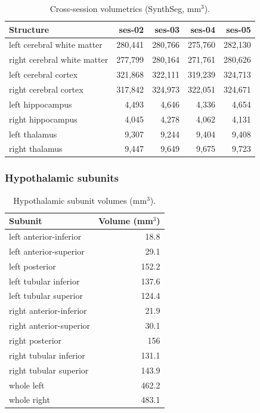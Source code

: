 \documentclass[11pt,a4paper]{article}\usepackage[]{graphicx}\usepackage[]{xcolor}
\begin{document}
\begin{table}[htbp]
\centering
\caption{Cross-session volumetrics (SynthSeg, mm$^3$).}
\label{tab:synthseg}
\begin{tabular}{lrrrr}
\toprule
Structure &  ses-02 & ses-03 & ses-04 & ses-05 \\
\midrule
left cerebral white matter  &  280,441 & 280,766 & 275,760 & 282,130 \\
right cerebral white matter  &  277,799 & 280,164 & 271,761 & 280,626 \\
left cerebral cortex  &  321,868 & 322,111 & 319,239 & 324,713 \\
right cerebral cortex  &  317,842 & 324,973 & 322,051 & 324,671 \\
left hippocampus  &  4,493 & 4,646 & 4,336 & 4,654 \\
right hippocampus  &  4,045 & 4,278 & 4,062 & 4,131 \\
left thalamus  &  9,307 & 9,244 & 9,404 & 9,408 \\
right thalamus  &  9,447 & 9,649 & 9,675 & 9,723 \\
\bottomrule
\end{tabular}
\end{table}


\subsubsection{Hypothalamic subunits}

\begin{table}[htbp]
\centering
\caption{Hypothalamic subunit volumes (mm$^3$).}
\label{tab:hypo}
\begin{tabular}{lr}
\toprule
Subunit & Volume (mm$^3$) \\
\midrule
left anterior-inferior  &  18.8 \\
left anterior-superior  &  29.1 \\
left posterior  &  152.2 \\
left tubular inferior  &  137.6 \\
left tubular superior  &  124.4 \\
right anterior-inferior  &  21.9 \\
right anterior-superior  &  30.1 \\
right posterior  &  156 \\
right tubular inferior  &  131.1 \\
right tubular superior  &  143.9 \\
whole left  &  462.2 \\
whole right  &  483.1 \\
\bottomrule
\end{tabular}
\end{table}
\end{document}
